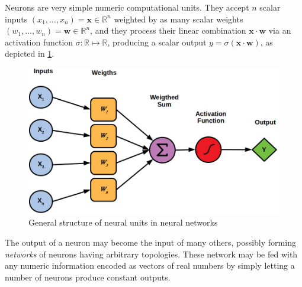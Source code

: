 \documentclass[12pt,a4paper,openright,twoside]{book}
\begin{document}
Neurons are very simple numeric computational units.
%
They accept $n$ scalar inputs $(x_1, \ldots, x_n) = \mathbf{x} \in \mathbb{R}^n$ weighted by as many scalar weights $(w_1, \ldots, w_n) = \mathbf{w} \in \mathbb{R}^n$, and they process their linear combination $\mathbf{x} \cdot \mathbf{w}$ via an activation function \cite{enwiki:ActivationFunctions} $\sigma : \mathbb{R} \mapsto \mathbb{R}$, producing a scalar output $y = \sigma(\mathbf{x} \cdot \mathbf{w})$, as depicted in \cref{fig:neuron}.
%
\begin{figure}
    \centering
    \includegraphics[width=.6\linewidth]{figures/neuron.png}
    \caption{General structure of neural units in neural networks}
    \label{fig:neuron}
\end{figure}
%
The output of a neuron may become the input of many others, possibly forming \emph{networks} of neurons having arbitrary topologies.
%
These network may be fed with any numeric information encoded as vectors of real numbers by simply letting a number of neurons produce constant outputs.
\end{document}
